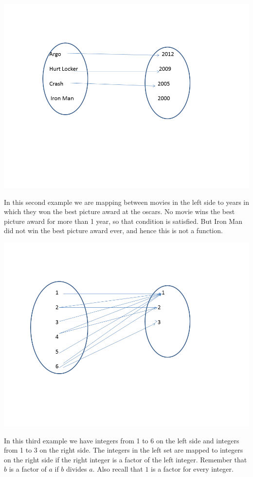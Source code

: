 \documentclass[12pt]{article}
\begin{document}
\includegraphics[scale=0.5]{func2.png}

In this second example we are mapping between movies in the left side to years in which they won the best picture award at the oscars. No movie wins the best picture award for more than 1 year, so that condition is satisfied. But Iron Man did not win the best picture award ever, and hence this is not a function.

\includegraphics[scale=0.5]{func3.png}

In this third example we have integers from 1 to 6 on the left side and integers from 1 to 3 on the right side. 
The integers in the left set are mapped to integers on the right side if the right integer is a factor of the left integer. Remember that $b$ is a factor of $a$ if $b$ divides $a$. Also recall that $1$ is a factor for every integer.
\end{document}
